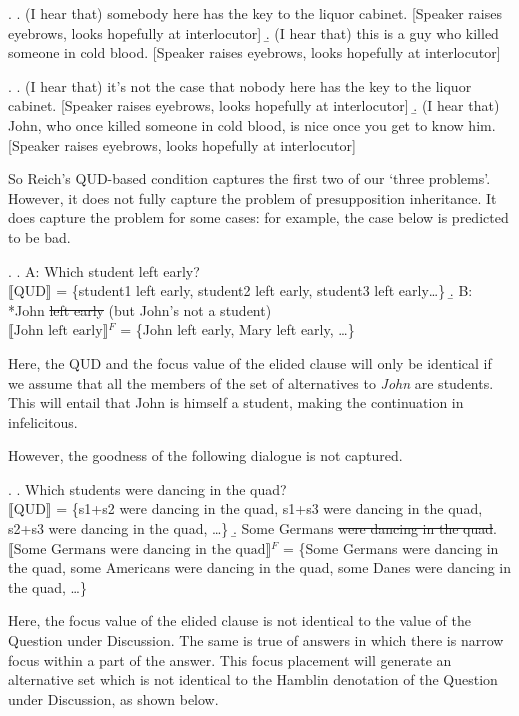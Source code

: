 \documentclass[doublespace]{umthesis}
\newcommand{\ext}[1]{\ensuremath{\llbracket \textrm{{#1}} \rrbracket}}
\begin{document}
\ex. 	\a. (I hear that) somebody here has the key to the liquor cabinet. [Speaker raises eyebrows, looks hopefully at interlocutor]
	\b. (I hear that) this is a guy who killed someone in cold blood. [Speaker raises eyebrows, looks hopefully at interlocutor]

\ex. 	\a. (I hear that) it's not the case that nobody here has the key to the liquor cabinet. [Speaker raises eyebrows, looks hopefully at interlocutor]
	\b. (I hear that) John, who once killed someone in cold blood, is nice once you get to know him. [Speaker raises eyebrows, looks hopefully at interlocutor]
	
So Reich's QUD-based condition captures the first two of our `three problems'. However, it does not fully capture the problem of presupposition inheritance. It does capture the problem for some cases: for example, the case below is predicted to be bad.

\ex. 	\a. A: Which student left early?\\
		\ext{QUD} = \{student1 left early, student2 left early, student3 left early\ldots\}
	\b. B: *John \sout{left early} (but John's not a student)\\
		\ext{John left early}$^F$ = \{John left early, Mary left early, \ldots\}
		
Here, the QUD and the focus value of the elided clause will only be identical if we assume that all the members of the set of alternatives to {\it John} are students. This will entail that John is himself a student, making the continuation in \Last[b] infelicitous.

However, the goodness of the following dialogue is not captured.

\ex. 	\a. Which students were dancing in the quad?\\
		\ext{QUD} = \{s1+s2 were dancing in the quad, s1+s3 were dancing in the quad, s2+s3 were dancing in the quad, \ldots\}
	\b. Some Germans \sout{were dancing in the quad}.\\
		\ext{Some Germans were dancing in the quad}$^F$ = \{Some Germans were dancing in the quad, some Americans were dancing in the quad, some Danes were dancing in the quad, \ldots\}
		
Here, the focus value of the elided clause is not identical to the value of the Question under Discussion. The same is true of answers in which there is narrow focus within a part of the answer. This focus placement will generate an alternative set which is not identical to the Hamblin denotation of the Question under Discussion, as shown below.
\end{document}
